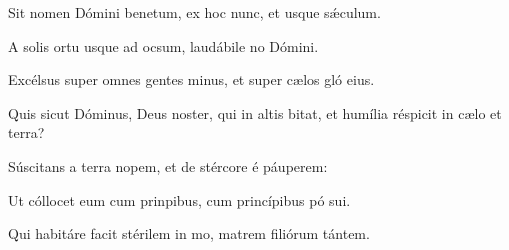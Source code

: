\item {}

\item Sit nomen Dómini benetum,\psstar{} ex hoc nunc, et usque  sǽculum.

\item A solis ortu usque ad ocsum,\psstar{} laudábile no Dómini.

\item Excélsus super omnes gentes minus,\psstar{} et super cælos gló eius.

\item Quis sicut Dóminus, Deus noster, qui in altis bitat,\psstar{} et humília réspicit in cælo et  terra?

\item Súscitans a terra nopem,\psstar{} et de stércore é páuperem:

\item Ut cóllocet eum cum prinpibus,\psstar{} cum princípibus pó sui.

\item Qui habitáre facit stérilem in mo,\psstar{} matrem filiórum tántem.